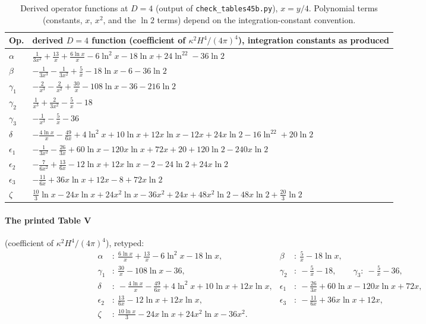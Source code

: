 \begin{table}[ht]
\centering\small
\renewcommand{\arraystretch}{1.35}
\begin{tabular}{ll}
\toprule
Op. & derived $D=4$ function (coefficient of $\kappa^2H^4/(4\pi)^4$), integration constants as produced\\
\midrule
$\alpha$ & $\frac{1}{3x^2}+\frac{13}{x}+\frac{6\ln x}{x}-6\ln^2x-18\ln x+24\ln^22-36\ln2$\\
$\beta$ & $-\frac{1}{3x^3}-\frac{1}{3x^2}+\frac5x-18\ln x-6-36\ln2$\\
$\gamma_1$ & $-\frac{2}{x^3}-\frac{2}{x^2}+\frac{30}{x}-108\ln x-36-216\ln2$\\
$\gamma_2$ & $\frac{1}{x^3}+\frac{2}{3x^2}-\frac5x-18$\\
$\gamma_3$ & $-\frac{1}{x^3}-\frac5x-36$\\
$\delta$ & $-\frac{4\ln x}{x}-\frac{49}{6x}+4\ln^2x+10\ln x+12x\ln x-12x+24x\ln2-16\ln^22+20\ln2$\\
$\epsilon_1$ & $-\frac{1}{3x^2}-\frac{26}{3x}+60\ln x-120x\ln x+72x+20+120\ln2-240x\ln2$\\
$\epsilon_2$ & $-\frac{7}{6x^2}+\frac{13}{6x}-12\ln x+12x\ln x-2-24\ln2+24x\ln2$\\
$\epsilon_3$ & $-\frac{11}{6x}+36x\ln x+12x-8+72x\ln2$\\
$\zeta$ & $\frac{10}{3}\ln x-24x\ln x+24x^2\ln x-36x^2+24x+48x^2\ln2-48x\ln2+\frac{20}{3}\ln2$\\
\bottomrule
\end{tabular}
\caption{Derived operator functions at $D=4$ (output of \texttt{check\_tables45b.py}), $x=y/4$. Polynomial terms (constants, $x$, $x^2$, and the
$\ln2$ terms) depend on the integration-constant convention.}
\label{ch6:tab:D4totals}
\end{table}

\paragraph{The printed Table V} (coefficient of $\kappa^2H^4/(4\pi)^4$), retyped:
\begin{equation*}
\begin{aligned}
\alpha&:\ \tfrac{6\ln x}{x}+\tfrac{13}{x}-6\ln^2x-18\ln x, &
\beta&:\ \tfrac5x-18\ln x,\\
\gamma_1&:\ \tfrac{30}{x}-108\ln x-36, &
\gamma_2&:\ -\tfrac5x-18,\qquad
\gamma_3:\ -\tfrac5x-36, \\
\delta&:\ -\tfrac{4\ln x}{x}-\tfrac{49}{6x}+4\ln^2x+10\ln x+12x\ln x, &
\epsilon_1&:\ -\tfrac{26}{3x}+60\ln x-120x\ln x+72x, \\
\epsilon_2&:\ \tfrac{13}{6x}-12\ln x+12x\ln x, &
\epsilon_3&:\ -\tfrac{11}{6x}+36x\ln x+12x,\\
\zeta&:\ \tfrac{10\ln x}{3}-24x\ln x+24x^2\ln x-36x^2 .
\end{aligned}
\end{equation*}

